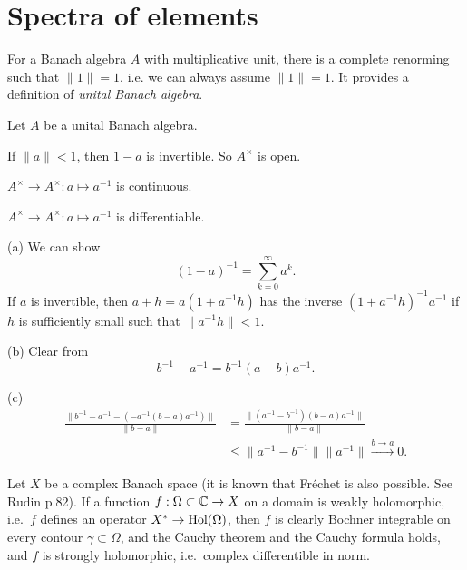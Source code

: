 \documentclass{../../large}
\begin{document}
\section{Spectra of elements}

\begin{prb}
For a Banach algebra $A$ with multiplicative unit, there is a complete renorming such that $\|1\|=1$, i.e. we can always assume $\|1\|=1$.
It provides a definition of \emph{unital Banach algebra}.

Let $A$ be a unital Banach algebra.
\begin{parts}
\item If $\|a\|<1$, then $1-a$ is invertible. So $A^\times$ is open.
\item $A^\times\to A^\times:a\mapsto a^{-1}$ is continuous.
\item $A^\times\to A^\times:a\mapsto a^{-1}$ is differentiable.
\end{parts}
\end{prb}
\begin{pf}
(a)
We can show
\[(1-a)^{-1}=\sum_{k=0}^\infty a^k.\]
If $a$ is invertible, then $a+h=a(1+a^{-1}h)$ has the inverse $(1+a^{-1}h)^{-1}a^{-1}$ if $h$ is sufficiently small such that $\|a^{-1}h\|<1$.

(b)
Clear from
\[b^{-1}-a^{-1}=b^{-1}(a-b)a^{-1}.\]

(c)
\begin{align*}
\frac{\|b^{-1}-a^{-1}-(-a^{-1}(b-a)a^{-1})\|}{\|b-a\|}
&=\frac{\|(a^{-1}-b^{-1})(b-a)a^{-1}\|}{\|b-a\|}\\
&\le\|a^{-1}-b^{-1}\|\|a^{-1}\|\xrightarrow{b\to a}0.
\end{align*}
\end{pf}

\begin{prb}
Let $X$ be a complex Banach space (it is known that Fr\'echet is also possible. See Rudin p.82).
If a function $f:\Omega\subset\mathbb{C}\to X$ on a domain is weakly holomorphic, i.e.~$f$ defines an operator $X^*\to\operatorname{Hol}(\Omega)$, then $f$ is clearly Bochner integrable on every contour $\gamma\subset\Omega$, and the Cauchy theorem and the Cauchy formula holds, and $f$ is strongly holomorphic, i.e.~complex differentible in norm.
\end{prb}
\end{document}
